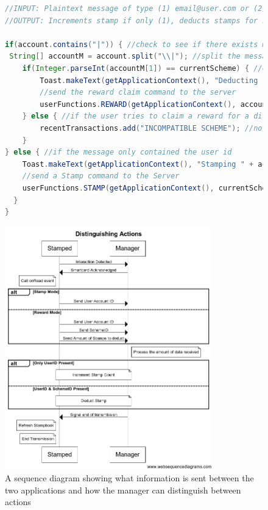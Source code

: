\begin{figure}[H]
\begin{lstlisting}[language=Java]
//INPUT: Plaintext message of type (1) email@user.com or (2) email@user.com|schemeID|amountToDeduct
//OUTPUT: Increments stamp if only (1), deducts stamps for reward if (2)

if(account.contains("|")) { //check to see if there exists more information
 String[] accountM = account.split("\\|"); //split the message into its components
    if(Integer.parseInt(accountM[1]) == currentScheme) { //check to see if the schemeID is the same as the current schemeID
        Toast.makeText(getApplicationContext(), "Deducting " + accountM[2] + " from:" + accountM[0], Toast.LENGTH_LONG).show();
        //send the reward claim command to the server
        userFunctions.REWARD(getApplicationContext(), accountM[0], accountM[1],accountM[2]);
    } else { //if the user tries to claim a reward for a different schemeID
        recentTransactions.add("INCOMPATIBLE SCHEME"); //notify that the transaction is using an incompatible scheme
    }
} else { //if the message only contained the user id
    Toast.makeText(getApplicationContext(), "Stamping " + account, Toast.LENGTH_LONG).show();
    //send a Stamp command to the Server
    userFunctions.STAMP(getApplicationContext(), currentScheme.toString(), getStampAmount());
  }
}

\end{lstlisting}
\end{figure}

\begin{figure}[H]
 \centering
  \includegraphics[width=0.8\textwidth]{img/sequence.png}
     \caption{A sequence diagram showing what information is sent between the two applications and how the manager can distinguish between actions}
     \label{fig:sequence}
\end{figure}

